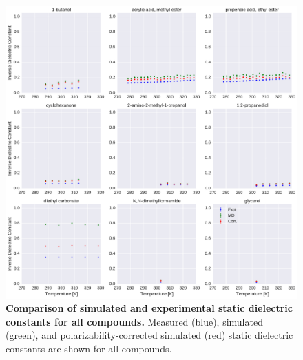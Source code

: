 \documentclass[journal=jacsat,manuscript=article]{achemso}
\begin{document}
\begin{figure}[alldielectric]

\includegraphics[width=\textwidth]{./figures/dielectric_versus_temperature_part0.pdf}

\caption{{\bf Comparison of simulated and experimental static dielectric constants for all compounds.}
Measured (blue), simulated (green), and polarizability-corrected simulated (red) static dielectric constants are shown for all compounds.
}

\label{figure:AllDielectrics}

\end{figure}
\end{document}
